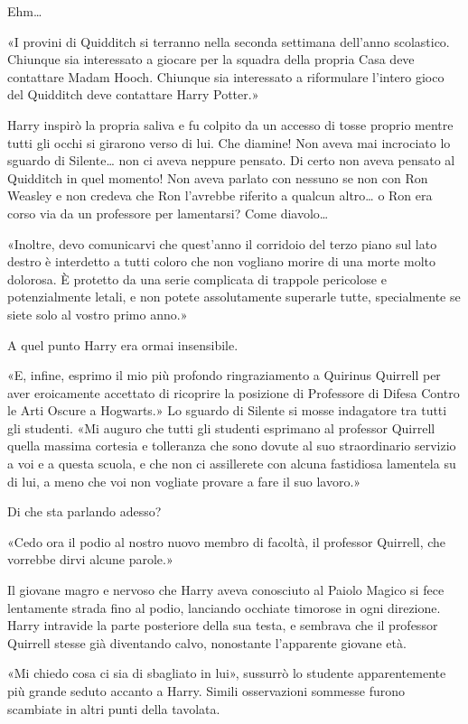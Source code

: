 Ehm…

«I provini di Quidditch si terranno nella seconda settimana dell’anno scolastico. Chiunque sia interessato a giocare per la squadra della propria Casa deve contattare Madam Hooch. Chiunque sia interessato a riformulare l’intero gioco del Quidditch deve contattare Harry Potter.»

Harry inspirò la propria saliva e fu colpito da un accesso di tosse proprio mentre tutti gli occhi si girarono verso di lui. Che diamine! Non aveva mai incrociato lo sguardo di Silente… non ci aveva neppure pensato. Di certo non aveva pensato al Quidditch in quel momento! Non aveva parlato con nessuno se non con Ron Weasley e non credeva che Ron l’avrebbe riferito a qualcun altro… o Ron era corso via da un professore per lamentarsi? Come diavolo…

«Inoltre, devo comunicarvi che quest’anno il corridoio del terzo piano sul lato destro è interdetto a tutti coloro che non vogliano morire di una morte molto dolorosa. È protetto da una serie complicata di trappole pericolose e potenzialmente letali, e non potete assolutamente superarle tutte, specialmente se siete solo al vostro primo anno.»

A quel punto Harry era ormai insensibile.

«E, infine, esprimo il mio più profondo ringraziamento a Quirinus Quirrell per aver eroicamente accettato di ricoprire la posizione di Professore di Difesa Contro le Arti Oscure a Hogwarts.» Lo sguardo di Silente si mosse indagatore tra tutti gli studenti. «Mi auguro che tutti gli studenti esprimano al professor Quirrell quella massima cortesia e tolleranza che sono dovute al suo straordinario servizio a voi e a questa scuola, e che non ci assillerete con alcuna fastidiosa lamentela su di lui, a meno che voi non vogliate provare a fare il suo lavoro.»

Di che sta parlando adesso?

«Cedo ora il podio al nostro nuovo membro di facoltà, il professor Quirrell, che vorrebbe dirvi alcune parole.»

Il giovane magro e nervoso che Harry aveva conosciuto al Paiolo Magico si fece lentamente strada fino al podio, lanciando occhiate timorose in ogni direzione. Harry intravide la parte posteriore della sua testa, e sembrava che il professor Quirrell stesse già diventando calvo, nonostante l’apparente giovane età.

«Mi chiedo cosa ci sia di sbagliato in lui», sussurrò lo studente apparentemente più grande seduto accanto a Harry. Simili osservazioni sommesse furono scambiate in altri punti della tavolata.

